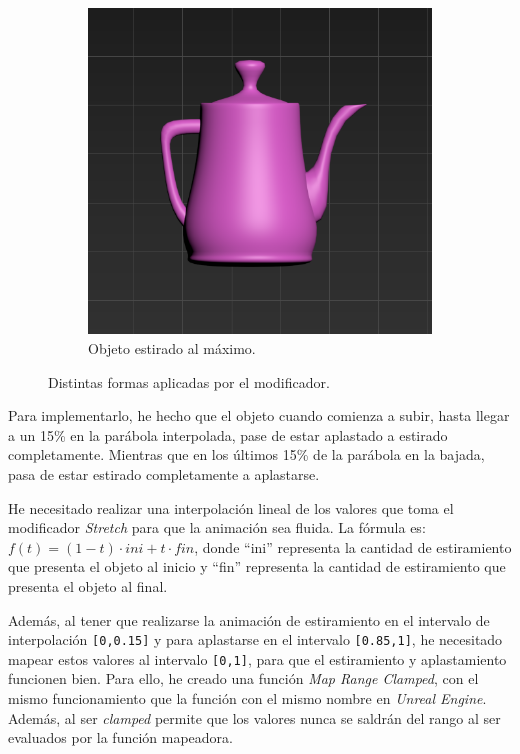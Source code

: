 \begin{figure}[H]
\begin{subfigure}[t]{0.45\textwidth}
	    \includegraphics[width=\textwidth]{imagenes/estirado.png}
        \caption{Objeto estirado al máximo.}
    \end{subfigure}    
    \caption{Distintas formas aplicadas por el modificador.}
\end{figure}

Para implementarlo, he hecho que el objeto cuando comienza a subir, hasta llegar a un 15\% en la parábola interpolada, pase de estar aplastado a estirado completamente. Mientras que en los últimos 15\% de la parábola en la bajada, pasa de estar estirado completamente a aplastarse.

\bigskip

He necesitado realizar una interpolación lineal de los valores que toma el modificador \textit{Stretch} para que la animación sea fluida. La fórmula es: $f(t)=(1-t) \cdot ini + t \cdot fin$, donde ``ini'' representa la cantidad de estiramiento que presenta el objeto al inicio y ``fin'' representa la cantidad de estiramiento que presenta el objeto al final.

\bigskip

Además, al tener que realizarse la animación de estiramiento en el intervalo de interpolación \verb|[0,0.15]| y para aplastarse en el intervalo \verb|[0.85,1]|, he necesitado mapear estos valores al intervalo \verb|[0,1]|, para que el estiramiento y aplastamiento funcionen bien. Para ello, he creado una función \textit{Map Range Clamped}, con el mismo funcionamiento que la función con el mismo nombre en \textit{Unreal Engine}. Además, al ser \textit{clamped} permite que los valores nunca se saldrán del rango al ser evaluados por la función mapeadora.